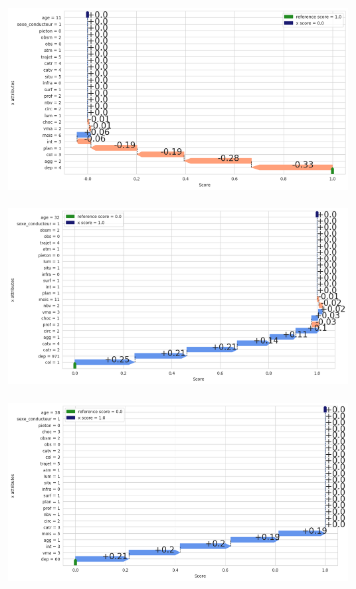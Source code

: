 \documentclass{article}
\begin{document}
    \begin{figure}[ht]
        \centering
        \begin{subfigure}{9cm}
            \includegraphics[width=9cm]{./img/shap7.png}
            \caption{}
        \end{subfigure}
        \begin{subfigure}{9cm}
            \includegraphics[width=9cm]{./img/shap6.png}
        \caption{}
        \end{subfigure}
        \begin{subfigure}{9cm}
            \includegraphics[width=9cm]{./img/shap5.png}
        \caption{}
        \end{subfigure}
    \end{figure}
\end{document}
